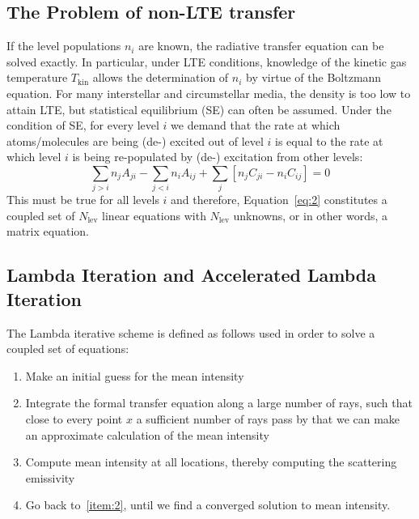 \documentclass{article}
\begin{document}
\subsection{The Problem of non-LTE transfer}
If the level populations \(n_i\) are known, 
the radiative transfer equation can be solved exactly. 
In particular, under LTE conditions, knowledge of the 
kinetic gas temperature \(T_{\text{kin}}\) allows the 
determination of 
\(n_i\) by virtue of the Boltzmann equation.
For many interstellar and circumstellar media, 
the density is too low to attain LTE, but 
statistical equilibrium (SE) can often be assumed.
Under the condition of SE, for every level \(i\) we 
demand that the rate at which atoms/molecules are being
(de-) excited out of level \(i\) is equal to the rate at 
which level \(i\) is being re-populated by
(de-) excitation from other levels:
\begin{equation}\label{eq:2}
    \sum_{j > i} n_j A_{ji} - \sum_{j < i} n_i A_{ij} + 
    \sum_{j} [n_j C_{ji} -n_i C_{ij}] = 0
\end{equation}
This must be true for all levels \(i\) and therefore,
Equation~\ref{eq:2} constitutes a coupled set of \(N_{\text{lev}}\)
linear equations with \(N_{\text{lev}}\) unknowns, or in other words,
a matrix equation.

\subsection{Lambda Iteration and Accelerated Lambda Iteration}
The Lambda iterative scheme is defined as follows used in order
to solve a coupled set of equations:
\begin{enumerate}
    \item Make an initial guess for the mean intensity
    \item  Integrate the formal transfer equation along a large number of rays, such that
    close to every point \(x\) a sufficient number of rays pass by that we can make an
    approximate calculation of the mean intensity\label{item:2}
    \item Compute mean intensity at all locations, thereby 
    computing the scattering emissivity
    \item Go back to~\ref{item:2}, until we find a converged solution to
    mean intensity.
\end{enumerate}
\end{document}
